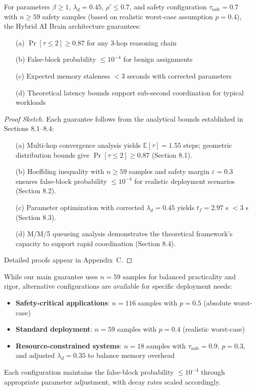 \documentclass{article}
\begin{document}
\begin{corollary}
\label{cor:systems_soundness}
For parameters $\beta \geq 1$, $\lambda_d = 0.45$, $\rho' \leq 0.7$, and safety configuration $\tau_{\text{safe}} = 0.7$ with $n \geq 59$ safety samples (based on realistic worst-case assumption $p = 0.4$), the Hybrid AI Brain architecture guarantees:
\begin{enumerate}
    \item[(a)] $\Pr[\tau \leq 2] \geq 0.87$ for any 3-hop reasoning chain
    \item[(b)] False-block probability $\leq 10^{-4}$ for benign assignments  
    \item[(c)] Expected memory staleness $< 3$ seconds with corrected parameters
    \item[(d)] Theoretical latency bounds support sub-second coordination for typical workloads
\end{enumerate}
\end{corollary}

\begin{proof}[Proof Sketch]
Each guarantee follows from the analytical bounds established in Sections 8.1--8.4:
\begin{enumerate}
    \item[(a)] Multi-hop convergence analysis yields $\mathbb{E}[\tau] = 1.55$ steps; geometric distribution bounds give $\Pr[\tau \leq 2] \geq 0.87$ (Section 8.1).
    \item[(b)] Hoeffding inequality with $n \geq 59$ samples and safety margin $\varepsilon = 0.3$ ensures false-block probability $\leq 10^{-4}$ for realistic deployment scenarios (Section 8.2).
    \item[(c)] Parameter optimization with corrected $\lambda_d = 0.45$ yields $t_f = 2.97$ s $< 3$ s (Section 8.3).
    \item[(d)] M/M/5 queueing analysis demonstrates the theoretical framework's capacity to support rapid coordination (Section 8.4).
\end{enumerate}
Detailed proofs appear in Appendix~C.
\end{proof}

\begin{remark}
While our main guarantee uses $n = 59$ samples for balanced practicality and rigor, alternative configurations are available for specific deployment needs:
\begin{itemize}
    \item \textbf{Safety-critical applications}: $n = 116$ samples with $p = 0.5$ (absolute worst-case)
    \item \textbf{Standard deployment}: $n = 59$ samples with $p = 0.4$ (realistic worst-case) 
    \item \textbf{Resource-constrained systems}: $n = 18$ samples with $\tau_{\text{safe}} = 0.9$, $p = 0.3$, and adjusted $\lambda_d = 0.35$ to balance memory overhead
\end{itemize}
Each configuration maintains the false-block probability $\leq 10^{-4}$ through appropriate parameter adjustment, with decay rates scaled accordingly.
\end{remark}
\end{document}
